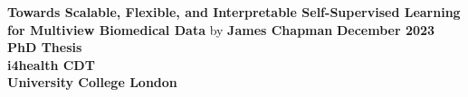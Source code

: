 \documentclass{report} %
\author{James Chapman}
\numberwithin{figure}{chapter}
\numberwithin{table}{section}
\begin{document}
\begin{titlepage}
    \centering
    {\LARGE\textbf{Towards Scalable, Flexible, and Interpretable Self-Supervised Learning for Multiview Biomedical Data}}
    \vspace{0.8cm}
    by
    \vspace{0.8cm}
    {\LARGE\textbf{James Chapman}}
    \vspace{1.5cm}
    {\LARGE\textbf{December 2023}}
    \vfill
    \textbf{
        PhD Thesis\\
        \vspace{1cm}
        i4health CDT\\
        University College London}
    \vspace{2cm}
\end{titlepage}

\onehalfspacing

\newpage



\newpage

\newpage
\dominitoc  %
\tableofcontents  %
\setcounter{tocdepth}{2}

\newpage
\listoffigures  %
\newpage
\listoftables  %

\newpage
\printglossary[type=\acronymtype, title=Acronyms]  %
\newpage
\printglossary[type=symbols, title=Symbols List]  %
\glsaddallunused[symbols]
\newpage
\printglossary[type=main, title=Definitions]  %
\glsaddallunused[main]









\end{document}

